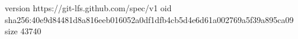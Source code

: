 version https://git-lfs.github.com/spec/v1
oid sha256:40e9d84481d8a816eeb016052a0df1dfb4cb5d4e6d61a002769a5f39a895ca09
size 43740
